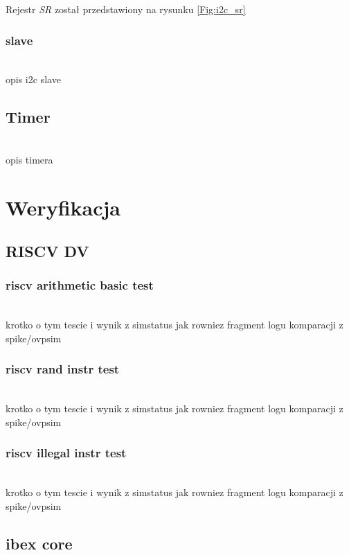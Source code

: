 \documentclass[11pt,a4paper]{article}
\begin{document}
Rejestr \textit{SR} został przedstawiony na rysunku \ref{Fig:i2c_sr}
		\subsubsection{slave}
		\hspace{5mm}
			\\opis i2c slave

	\subsection{Timer}
	\hspace{5mm}
		\\opis timera


\newpage
\section{Weryfikacja}

	\subsection{RISCV DV}
		\subsubsection{riscv arithmetic basic test}
		\hspace{5mm}
			\\krotko o tym tescie i wynik z simstatus jak rowniez fragment logu komparacji z spike/ovpsim
			
		\subsubsection{riscv rand instr test}
		\hspace{5mm}
			\\krotko o tym tescie i wynik z simstatus jak rowniez fragment logu komparacji z spike/ovpsim
			
		\subsubsection{riscv illegal instr test}
		\hspace{5mm}
			\\krotko o tym tescie i wynik z simstatus jak rowniez fragment logu komparacji z spike/ovpsim

\subsection{ibex core}
\end{document}
